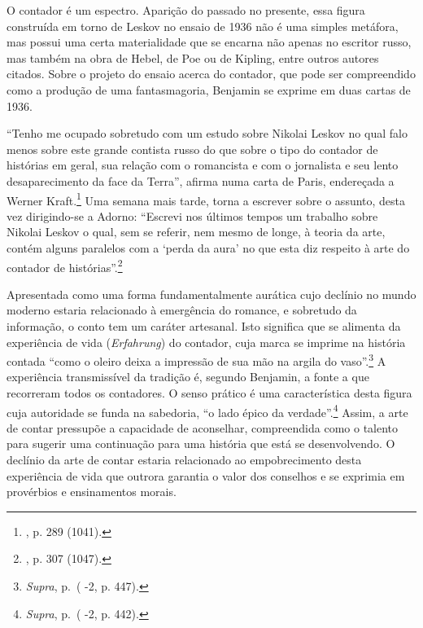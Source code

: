 O contador é um espectro. Aparição do passado no presente, essa figura
construída em torno de Leskov no ensaio de 1936 não é uma simples
metáfora, mas possui uma certa materialidade que se encarna não apenas
no escritor russo, mas também na obra de Hebel, de Poe ou de Kipling,
entre outros autores citados. Sobre o projeto do ensaio acerca do
contador, que pode ser compreendido como a produção de uma
fantasmagoria, Benjamin se exprime em duas cartas de 1936.

``Tenho me ocupado sobretudo com um estudo sobre Nikolai Leskov no qual
falo menos sobre este grande contista russo do que sobre o tipo do
contador de histórias em geral, sua relação com o romancista e com o
jornalista e seu lento desaparecimento da face da Terra'', afirma numa
carta de Paris, endereçada a Werner Kraft.\footnote{ , p. 289 (1041).}
Uma semana mais tarde, torna a escrever sobre o assunto, desta vez
dirigindo-se a Adorno: ``Escrevi nos últimos tempos um trabalho sobre
Nikolai Leskov o qual, sem se referir, nem mesmo de longe, à teoria da
arte, contém alguns paralelos com a `perda da aura' no que esta diz
respeito à arte do contador de histórias''.\footnote{ , p. 307
  (1047).}

Apresentada como uma forma fundamentalmente aurática cujo declínio no
mundo moderno estaria relacionado à emergência do romance, e sobretudo
da informação, o conto tem um caráter artesanal. Isto significa que se
alimenta da experiência de vida (\emph{Erfahrung}) do contador, cuja
marca se imprime na história contada ``como o oleiro deixa a impressão
de sua mão na argila do vaso''.\footnote{\emph{Supra}, p.\,\pageref{supra} ( -2, p.
  447).} A experiência transmissível da tradição é, segundo Benjamin, a
fonte a que recorreram todos os contadores. O senso prático é uma
característica desta figura cuja autoridade se funda na sabedoria, ``o
lado épico da verdade''.\footnote{\emph{Supra}, p.\,\pageref{supra2} ( -2, p. 442).}
Assim, a arte de contar pressupõe a capacidade de aconselhar,
compreendida como o talento para sugerir uma continuação para uma
história que está se desenvolvendo. O declínio da arte de contar estaria
relacionado ao empobrecimento desta experiência de vida que outrora
garantia o valor dos conselhos e se exprimia em provérbios e
ensinamentos morais.

